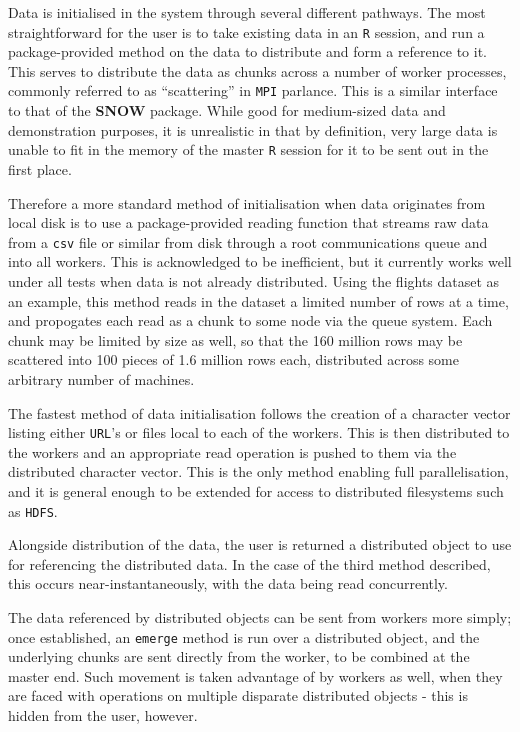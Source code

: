 Data is initialised in the system through several different pathways.
The most straightforward for the user is to take existing data in an \texttt{R} session, and run a package-provided method on the data to distribute and form a reference to it.
This serves to distribute the data as chunks across a number of worker processes, commonly referred to as ``scattering'' in \texttt{MPI} parlance\cite{walker1996mpi}.
This is a similar interface to that of the \textbf{SNOW} package\cite{tierney18}.
While good for medium-sized data and demonstration purposes, it is unrealistic in that by definition, very large data is unable to fit in the memory of the master \texttt{R} session for it to be sent out in the first place.

Therefore a more standard method of initialisation when data originates from local disk is to use a package-provided reading function that streams raw data from a \texttt{csv} file or similar from disk through a root communications queue and into all workers.
This is acknowledged to be inefficient, but it currently works well under all tests when data is not already distributed.
Using the flights dataset as an example, this method reads in the dataset a limited number of rows at a time, and propogates each read as a chunk to some node via the queue system.
Each chunk may be limited by size as well, so that the 160 million rows may be scattered into 100 pieces of 1.6 million rows each, distributed across some arbitrary number of machines.

The fastest method of data initialisation follows the creation of a character vector listing either \texttt{URL}'s or files local to each of the workers.
This is then distributed to the workers and an appropriate read operation is pushed to them via the distributed character vector.
This is the only method enabling full parallelisation, and it is general enough to be extended for access to distributed filesystems such as \texttt{HDFS}.

Alongside distribution of the data, the user is returned a distributed object to use for referencing the distributed data.
In the case of the third method described, this occurs near-instantaneously, with the data being read concurrently.

The data referenced by distributed objects can be sent from workers more simply; once established, an \texttt{emerge} method is run over a distributed object, and the underlying chunks are sent directly from the worker, to be combined at the master end.
Such movement is taken advantage of by workers as well, when they are faced with operations on multiple disparate distributed objects - this is hidden from the user, however.

